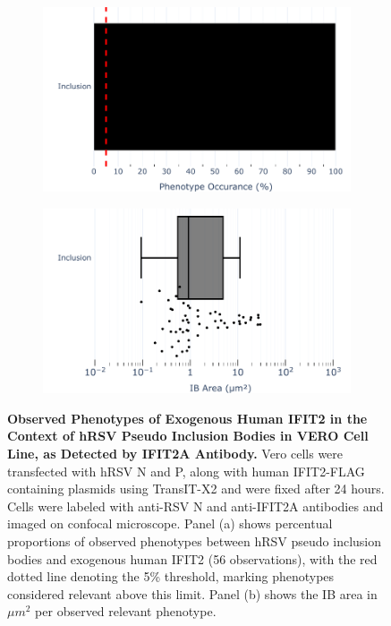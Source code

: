 \begin{figure}
    \begin{subfigure}{0.495\textwidth}
        \caption{}
        \includegraphics[width=1\linewidth]{08. Chapter 3/Figs/03. pIB/03. IFIT2/04. IFIT2-FLAG/01. IFIT2A/01. bar_i2a_hnhp.pdf} 
    \end{subfigure}
    \begin{subfigure}{0.495\textwidth}
        \caption{}
        \includegraphics[width=1\linewidth]{08. Chapter 3/Figs/03. pIB/03. IFIT2/04. IFIT2-FLAG/01. IFIT2A/02. box_i2a_hnhp.pdf}
    \end{subfigure}
    \caption[Observed Phenotypes of Exogenous Human IFIT2 in the Context of hRSV Pseudo Inclusion Bodies in VERO Cell Line, as Detected by IFIT2A Antibody.]{\textbf{Observed Phenotypes of Exogenous Human IFIT2 in the Context of hRSV Pseudo Inclusion Bodies in VERO Cell Line, as Detected by IFIT2A Antibody.} Vero cells were transfected with hRSV N and P, along with human IFIT2-FLAG containing plasmids using TransIT-X2 and were fixed after 24 hours. Cells were labeled with anti-RSV N and anti-IFIT2A antibodies and imaged on confocal microscope. Panel (a) shows percentual proportions of observed phenotypes between hRSV pseudo inclusion bodies and exogenous human IFIT2 (56 observations), with the red dotted line denoting the 5\% threshold, marking phenotypes considered relevant above this limit. Panel (b) shows the IB area in \(\mu m^2\) per observed relevant phenotype.}
    \label{fig:Observed Phenotypes of Exogenous Human IFIT2 in the Context of hRSV Pseudo Inclusion Bodies in VERO Cell Line, as Detected by IFIT2A Antibody}
\end{figure}

